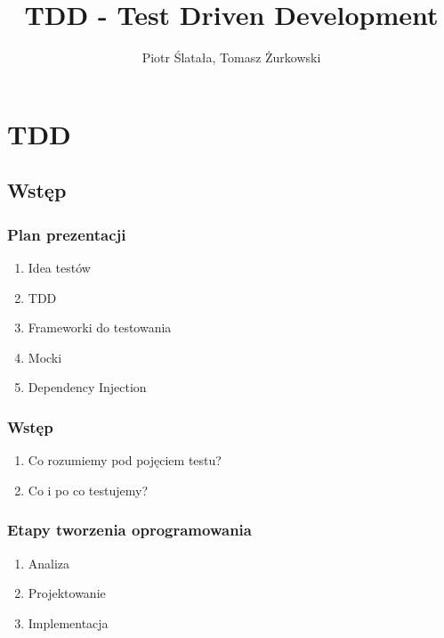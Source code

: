 \documentclass[slidestop,compress,mathserif]{beamer}
\title{TDD - Test Driven Development}
\author{Piotr Ślatała, Tomasz Żurkowski}
\begin{document}
\section{TDD}

\subsection{Wstęp}
\frame{
 \titlepage
}

\begin{frame}
 \frametitle{Plan prezentacji}
 \begin{enumerate}
 \item Idea testów
 \pause \item TDD
 \pause \item Frameworki do testowania
 \pause \item Mocki
 \pause \item Dependency Injection
\end{enumerate}

\end{frame}


\begin{frame}
 \frametitle{Wstęp}
\begin{enumerate}
 \item Co rozumiemy pod pojęciem testu? %
 \pause \item Co i po co testujemy? %
\end{enumerate}
\end{frame}

\begin{frame}
\frametitle{Etapy tworzenia oprogramowania}
\begin{enumerate}
\pause \item Analiza
\pause \item Projektowanie
\pause \item Implementacja
\end{enumerate}
\end{frame}
\end{document}
